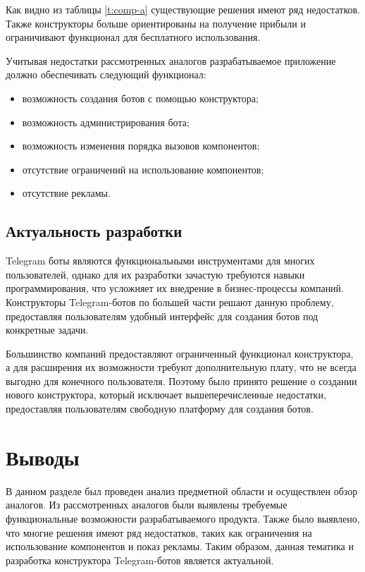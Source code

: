 Как видно из таблицы \ref{t:comp-a}
существующие решения имеют ряд недостатков.
Также конструкторы больше ориентированы на получение прибыли и
ограничивают функционал для бесплатного использования.

Учитывая недостатки рассмотренных аналогов разрабатываемое приложение должно обеспечивать следующий функционал:

\begin{itemize}

	\item возможность создания ботов с помощью конструктора;
	\item возможность администрирования бота;
	\item возможность изменения порядка вызовов компонентов;
	\item отсутствие ограничений на использование компонентов;
	\item отсутствие рекламы.

\end{itemize}

\subsection{Актуальность разработки}

Telegram боты являются функциональными инструментами для многих пользователей,
однако для их разработки зачастую требуются навыки программирования,
что усложняет их внедрение в бизнес-процессы компаний.
Конструкторы Telegram-ботов по большей части решают данную проблему,
предоставляя пользователям удобный интерфейс для создания ботов под конкретные задачи.

Большинство компаний предоставляют ограниченный
функционал конструктора, а для расширения их возможности требуют дополнительную
плату, что не всегда выгодно для конечного пользователя.
Поэтому было принято решение о создании нового конструктора, который исключает
вышеперечисленные недостатки, предоставляя пользователям свободную платформу для
создания ботов.

\section*{Выводы}

В данном разделе был проведен анализ предметной области и осуществлен обзор аналогов.
Из рассмотренных аналогов были выявлены требуемые
функциональные возможности разрабатываемого продукта.
Также было выявлено, что многие решения имеют ряд недостатков,
таких как ограничения на использование компонентов и показ рекламы.
Таким образом, данная тематика
и разработка конструктора Telegram-ботов является актуальной.



